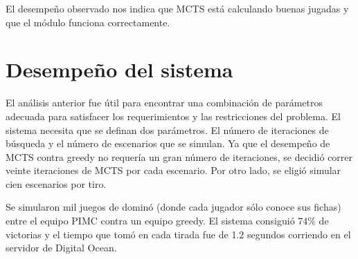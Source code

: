 El desempeño observado nos indica que MCTS está calculando buenas jugadas y que el 
módulo funciona correctamente.


\section{Desempeño del sistema}

El análisis anterior fue útil para encontrar una combinación de parámetros adecuada para 
satisfacer los requerimientos y las restricciones del problema. El sistema necesita que se 
definan dos parámetros. El número de iteraciones de búsqueda y el número de escenarios 
que se simulan. Ya que el desempeño de MCTS contra greedy no requería un gran número 
de iteraciones, se decidió correr veinte iteraciones de MCTS por cada escenario. Por otro 
lado, se eligió simular cien escenarios por tiro.

Se simularon mil juegos de dominó (donde cada jugador sólo conoce sus fichas) entre el 
equipo PIMC contra un equipo greedy. El sistema consiguió 74\% de victorias y el tiempo 
que tomó en cada tirada fue de 1.2 segundos corriendo en el servidor de Digital Ocean.